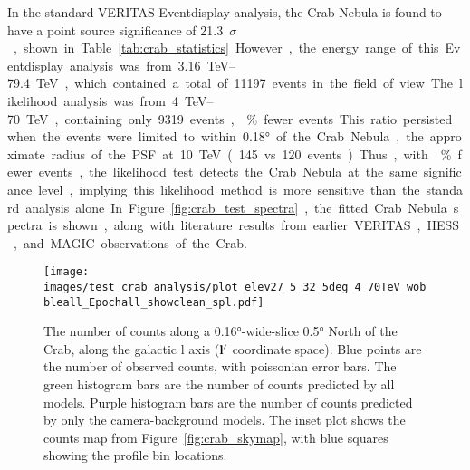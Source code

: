   In the standard VERITAS Eventdisplay analysis, the Crab Nebula is found to have a point source significance of \SI{21.3}{$\sigma$}, shown in Table~\ref{tab:crab_statistics}.
  However, the energy range of this Eventdisplay analysis was from \SIrange{3.16}{79.4}{TeV}, which contained a total of 11197 events in the field of view.
  The likelihood analysis was from \SIrange{4}{70}{TeV}, containing only 9319 events, \% fewer events.
  This ratio persisted when the events were limited to within \ang{0.18} of the Crab Nebula, the approximate radius of the PSF at \SI{10}{TeV} (145 vs 120 events).
  Thus, with \% fewer events, the likelihood test detects the Crab Nebula at the same significance level, implying this likelihood method is more sensitive than the standard analysis alone.
  In Figure~\ref{fig:crab_test_spectra}, the fitted Crab Nebula spectra is shown, along with literature results from earlier VERITAS, HESS, and MAGIC observations of the Crab.
  
  \begin{figure}[h]
    \centering
    \texttt{[image: images/test\_crab\_analysis/plot\_elev27\_5\_32\_5deg\_4\_70TeV\_wobbleall\_Epochall\_showclean\_spl.pdf]}
    \caption[Crab Profile along Galactic l]
    {
      The number of counts along a \ang{0.16}-wide-slice \ang{0.5} North of the Crab, along the galactic l axis ($\mathbf{l'}$ coordinate space).
      Blue points are the number of observed counts, with poissonian error bars.
      The green histogram bars are the number of counts predicted by all models.
      Purple histogram bars are the number of counts predicted by only the camera-background models.
      The inset plot shows the counts map from Figure~\ref{fig:crab_skymap}, with blue squares showing the profile bin locations.
    }
    \label{fig:crab_profile_l}
  \end{figure}

